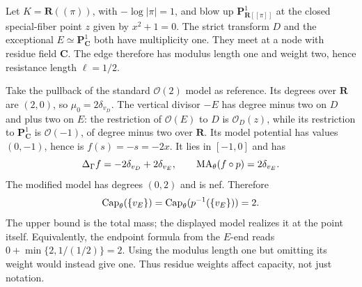 \begin{example}
\label{ex:ch25-nonsplit-capacity}
Let \(K=\mathbf R((\pi))\), with \(-\log|\pi|=1\), and blow up
\(\mathbf P^1_{\mathbf R[[\pi]]}\) at the closed special-fiber point
\(z\) given by \(x^2+1=0\).
The strict transform \(D\) and the exceptional
\(E\simeq\mathbf P^1_{\mathbf C}\) both have multiplicity one.
They meet at a node with residue field \(\mathbf C\).
The edge therefore has modulus length one and weight two, hence
resistance length \(\ell=1/2\).

Take the pullback of the standard \(\mathcal O(2)\) model as
reference.  Its degrees over \(\mathbf R\) are \((2,0)\), so
\(\mu_0=2\delta_{v_D}\).
The vertical divisor \(-E\) has degree minus two on \(D\) and
plus two on \(E\): the restriction of \(\mathcal O(E)\) to \(D\)
is \(\mathcal O_D(z)\), while its restriction to
\(\mathbf P^1_{\mathbf C}\) is \(\mathcal O(-1)\), of degree
minus two over \(\mathbf R\).
Its model potential has values \((0,-1)\), hence is
\(f(s)=-s=-2x\).  It lies in \([-1,0]\) and has
\[
 \Delta_\Gamma f=-2\delta_{v_D}+2\delta_{v_E},
 \qquad \operatorname{MA}_\theta(f\circ p)=2\delta_{v_E}.
\]
The modified model has degrees \((0,2)\) and is nef.  Therefore
\[
 \operatorname{Cap}_\theta(\{v_E\})
 =\operatorname{Cap}_\theta(p^{-1}(\{v_E\}))=2.
\]
The upper bound is the total mass; the displayed model realizes
it at the point itself.  Equivalently, the endpoint formula from
the \(E\)-end reads \(0+\min\{2,1/(1/2)\}=2\).
Using the modulus length one but omitting its weight would instead
give one.  Thus residue weights affect capacity, not just notation.
\end{example}

